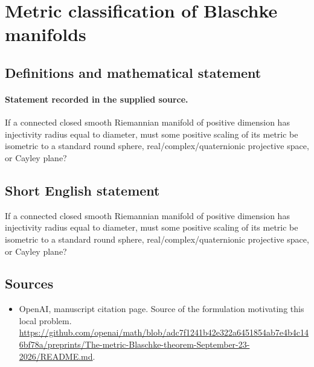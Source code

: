 \documentclass[11pt]{article}
\begin{document}
\section*{Metric classification of Blaschke manifolds}\label{statement}
\subsection{Definitions and mathematical statement}
\paragraph{Statement recorded in the supplied source.}
If a connected closed smooth Riemannian manifold of positive dimension has injectivity radius equal to diameter, must some positive scaling of its metric be isometric to a standard round sphere, real/complex/quaternionic projective space, or Cayley plane?
\subsection{Short English statement}
If a connected closed smooth Riemannian manifold of positive dimension has injectivity radius equal to diameter, must some positive scaling of its metric be isometric to a standard round sphere, real/complex/quaternionic projective space, or Cayley plane?
\subsection{Sources}
\begin{itemize}
\item[S1] OpenAI, manuscript citation page. Source of the formulation motivating this local problem.
\url{https://github.com/openai/math/blob/adc7f1241b42e322a6451854ab7e4b4c146bf78a/preprints/The-metric-Blaschke-theorem-September-23-2026/README.md}.
\end{itemize}
\end{document}
